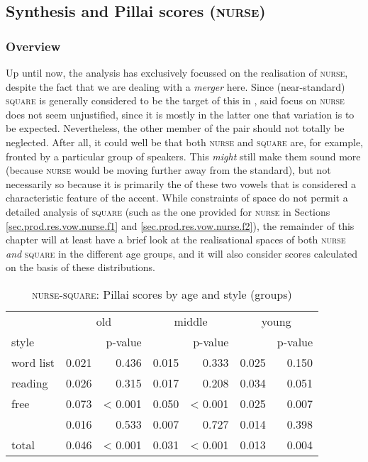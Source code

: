 \subsection{Synthesis and Pillai scores (\textrm{\textsc{nurse}})}
\label{sec.prod.res.vow.nurse.pil}

\subsubsection{Overview}
Up until now, the analysis has exclusively focussed on the realisation of \textsc{nurse}, despite the fact that we are dealing with a  \emph{merger} here.
Since (near-standard) \textsc{square} is generally considered to be the target of this  in , said focus on \textsc{nurse} does not seem unjustified, since it is mostly in the latter one that variation is to be expected.
Nevertheless, the other member of the pair should not totally be neglected.
After all, it could well be that both \textsc{nurse} and \textsc{square} are, for example, fronted by a particular group of speakers.
This \emph{might} still make them sound more  (because \textsc{nurse} would be moving further away from the standard), but not necessarily so because it is primarily the  of these two vowels that is considered a characteristic feature of the accent.
While constraints of space do not permit a detailed analysis of \textsc{square} (such as the one provided for \textsc{nurse} in Sections \ref{sec.prod.res.vow.nurse.f1} and \ref{sec.prod.res.vow.nurse.f2}), the remainder of this chapter will at least have a brief look at the realisational spaces of both \textsc{nurse} \emph{and} \textsc{square} in the different age groups, and it will also consider  scores calculated on the basis of these distributions.

\begin{table}[h!]
	\centering
	\caption{\textsc{nurse}-\textsc{square}: Pillai scores by age and style (groups)}
	\label{tab.pillai.nurse.agestyle}
	\begin{tabular}{lrrrrrr}
		\hline
		& \multicolumn{2}{c}{old} & \multicolumn{2}{c}{middle} & \multicolumn{2}{c}{young}\\
		style & \isi{Pillai} & p-value & \isi{Pillai} & p-value & \isi{Pillai} & p-value\\
		\hline
		word list & 0.021 & 0.436 & 0.015 & 0.333 & 0.025 & 0.150\\
		reading & 0.026 & 0.315 & 0.017 & 0.208 & 0.034 & 0.051\\
		free & 0.073 & < 0.001 & 0.050 & < 0.001 & 0.025 & 0.007\\
		\isi{imitation} & 0.016 & 0.533 & 0.007 & 0.727 & 0.014 & 0.398\\
		total & 0.046 & < 0.001 & 0.031 & < 0.001 & 0.013 & 0.004\\
		\hline
	\end{tabular}
\end{table}

